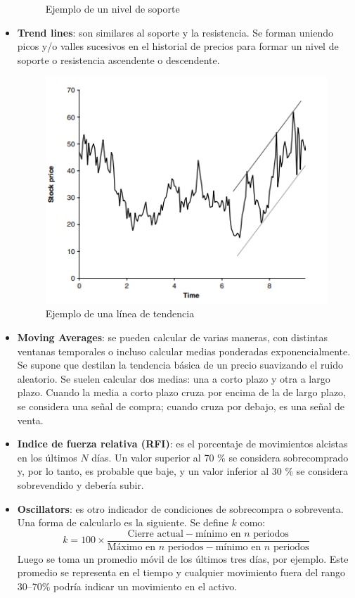 \begin{itemize}
\begin{figure}[H]
            \caption{Ejemplo de un nivel de soporte}
        \end{figure}
    \item \textbf{Trend lines}: son similares al soporte y la resistencia. Se forman uniendo picos y/o valles sucesivos en el historial de precios para formar un nivel de soporte o resistencia ascendente o descendente.
        \begin{figure}[H]
            \centering
            \includegraphics[width=0.65\linewidth]{Imagenes/16_Prediccion/Trendlines.png}
            \caption{Ejemplo de una línea de tendencia}
        \end{figure}
    \item \textbf{Moving Averages}: se pueden calcular de varias maneras, con distintas ventanas temporales o incluso calcular medias ponderadas exponencialmente. Se supone que  destilan la tendencia básica de un precio suavizando el ruido aleatorio. Se suelen calcular dos medias: una a corto plazo y otra a largo plazo. Cuando la media a corto plazo cruza por encima de la de largo plazo, se considera una señal de compra; cuando cruza por debajo, es una señal de venta. 
    \item \textbf{Indice de fuerza relativa (RFI)}: es el porcentaje de movimientos alcistas en los últimos $N$ días. Un valor superior al 70 \% se considera sobrecomprado y, por lo tanto, es probable que baje, y un valor inferior al 30 \% se considera sobrevendido y debería subir.
    \item \textbf{Oscillators}: es otro indicador de condiciones de sobrecompra o sobreventa. Una forma de calcularlo es la siguiente. Se define $k$ como:
    \[
        k = 100 \times \frac{\text{Cierre actual} - \text{mínimo en } n \text{ periodos}}{\text{Máximo en } n \text{ periodos} - \text{mínimo en } n \text{ periodos}}
    \]
    Luego se toma un promedio móvil de los últimos tres días, por ejemplo. Este promedio se representa en el tiempo y cualquier movimiento fuera del rango 30--70\% podría indicar un movimiento en el activo.

\end{itemize}
